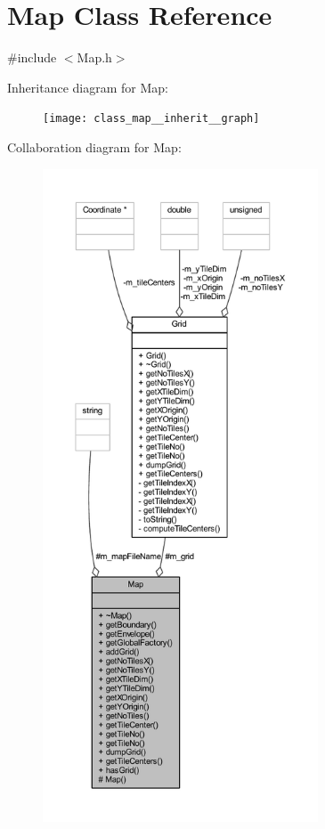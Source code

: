 \hypertarget{class_map}{}\section{Map Class Reference}
\label{class_map}


{\ttfamily \#include $<$Map.\+h$>$}



Inheritance diagram for Map\+:
\nopagebreak
\begin{figure}[H]
\begin{center}
\leavevmode
\texttt{[image: class\_map\_\_inherit\_\_graph]}
\end{center}
\end{figure}


Collaboration diagram for Map\+:
\nopagebreak
\begin{figure}[H]
\begin{center}
\leavevmode
\includegraphics[height=550pt]{class_map__coll__graph}
\end{center}
\end{figure}
